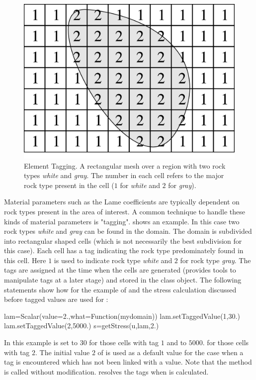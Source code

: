 \begin{figure}
\includegraphics[width=\textwidth]{EscriptDiagram2.eps}
\caption{\label{Figure: tag}Element Tagging. A rectangular mesh over a region with two rock types {\it white} and {\it gray}.
The number in each cell refers to the major rock type present in the cell ($1$ for {\it white} and $2$ for {\it gray}).
}
\end{figure}

Material parameters such as the Lame coefficients are typically dependent on rock types present in the 
area of interest. A common technique to handle these kinds of material parameters is "tagging". 
shows an example. In this case two rock types {\it white} and {\it gray} can be found in the domain. The domain
is subdivided into rectangular shaped cells (which is not necessarily the best subdivision for this case). Each 
cell has a tag indicating the rock type predominately found in this cell. Here $1$ is used to indicate
rock type {\it white} and $2$ for rock type {\it gray}. The tags are assigned at the time when the cells are generated
(\escript provides tools to manipulate tags at a later stage) 
and stored in the \Domain class object. The following statements show how for the
example of  and the stress calculation discussed before tagged values are used for
:
\begin{python}
lam=Scalar(value=2.,what=Function(mydomain))
lam.setTaggedValue(1,30.)
lam.setTaggedValue(2,5000.)
s=getStress(u,lam,2.)
\end{python}
In this example  is set to $30$ for those cells with tag $1$ and to $5000.$ for those cells 
with tag $2$. The initial value $2$ of  is used as a default value for the case when a tag
is encountered which has not been linked with a value. Note that the  method
is called without modification. \escript resolves the tags when  is calculated.

